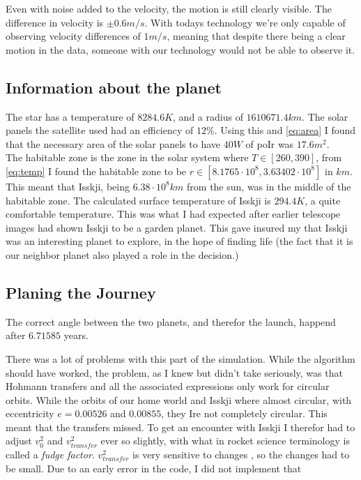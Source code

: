 \documentclass[a4paper, 10pt]{article}
\begin{document}
Even with noise added to the velocity, the motion is still clearly visible. The difference in velocity is $\pm 0.6 m/s$. With todays technology we're only capable of observing velocity differences of $1 m/s$, meaning that despite there being a clear motion in the data, someone with our technology would not be able to observe it.




\subsection{Information about the planet}
The star has a temperature of $8284.6 K$, and a radius of $1610671.4 km$. The solar panels the satellite used had an efficiency of $12\%$. Using this and \ref{eq:area} I found that the necessary area of the solar panels to have $40W$ of poIr was   $17.6 m^2$. \\

The habitable zone is the zone in the solar system where $T \in [260,390]$, from \ref{eq:temp} I found the habitable zone to be $r \in [8.1765\cdot 10^8,3.63402\cdot 10^8]$ in $km$. This meant that Isskji, being $6.38 \cdot 10^8 km$ from the sun, was in the middle of the habitable zone. The calculated surface temperature of Isskji is $294.4 K$, a quite comfortable temperature. This was what I had expected after earlier telescope images had shown Isskji to be a garden planet. This gave insured my that Isskji was an interesting planet to explore, in the hope of finding life (the fact that it is our neighbor planet also played a role in the decision.) 

\subsection{Planing the Journey}

The correct angle between the two planets, and therefor the launch, happend after $6.71585$ years.

There was a lot of problems with this part of the simulation. While the algorithm should have worked, the problem, as I knew but didn't take seriously, was that Hohmann transfers and all the associated expressions only work for circular orbits. While the orbits of our home world and Isskji where almost circular, with eccentricity $e = 0.00526$ and $0.00855$, they Ire not completely circular. This meant that the transfers missed. To get an encounter with Isskji I therefor had to adjust $v_0^2$ and $v_{transfer}^2$ ever so slightly, with what in rocket science terminology is called a \textit{fudge factor}. $v_{transfer}^2$ is very sensitive to changes \cite{SpaceDynamics}, so the changes had to be small. Due to an early error in the code, I did not implement that
\end{document}
